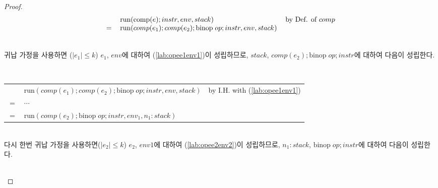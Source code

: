 \documentclass[runningheads]{llncs}
\begin{document}
\begin{proof}
\[
\begin{tabular}{l l l}
       & $\text{run}(\text{comp}(e); instr, env, stack)$  & by Def. of $comp$\\
   $=$ & $\text{run}(comp(e_1); comp(e_2); \text{binop} \; op; instr, env, stack)$ & %
\end{tabular}
\]

\ \\

귀납 가정을 사용하면 ($|e_1| \leq k$) $e_1$, $env$에 대하여 (\ref{lab:opee1env1})이 성립하므로, $stack$, $comp(e_2); \text{binop} \; op; instr$에 대하여 다음이 성립한다.

\ \\ 

\begin{tabular}{l l l}
      & $\text{run}(comp(e_1); comp(e_2); \text{binop} \; op; instr, env, stack)$ & by I.H. with (\ref{lab:opee1env1})\\
   $=$ & $\cdots$ & \\
   $=$ & $\text{run}(comp(e_2); \text{binop} \; op; instr, env_1, n_1:stack)$ & %
\end{tabular}

\ \\

다시 한번 귀납 가정을 사용하면($|e_2| \leq k$) $e_2$, $env1$에 대하여 (\ref{lab:opee2env2})이 성립하므로, $n_1:stack$, $\text{binop} \; op; instr$에 대하여 다음이 성립한다. 

\ \\ 


\end{proof}
\end{document}
